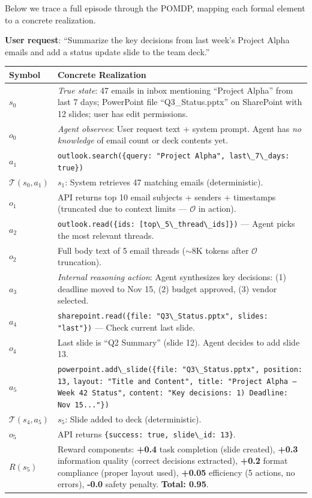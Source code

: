 \begin{examplebox}
Below we trace a full episode through the POMDP, mapping each formal element to a concrete realization.

\textbf{User request}: ``Summarize the key decisions from last week’s Project Alpha emails and add a status update slide to the team deck.''

\begin{tabular}{@{}lp{11cm}@{}}
\toprule
\textbf{Symbol} & \textbf{Concrete Realization} \\
\midrule
$s_0$ & \emph{True state}: 47 emails in inbox mentioning ``Project Alpha'' from last 7 days; PowerPoint file ``Q3\_Status.pptx'' on SharePoint with 12 slides; user has edit permissions. \\
$o_0$ & \emph{Agent observes}: User request text + system prompt. Agent has \emph{no knowledge} of email count or deck contents yet. \\
$a_1$ & \verb|outlook.search({query: "Project Alpha", last\_7\_days: true})| \\
$\mathcal{T}(s_0, a_1)$ & $s_1$: System retrieves 47 matching emails (deterministic). \\
$o_1$ & API returns top 10 email subjects + senders + timestamps (truncated due to context limits --- $\mathcal{O}$ in action). \\
$a_2$ & \verb|outlook.read({ids: [top\_5\_thread\_ids]})| --- Agent picks the most relevant threads. \\
$o_2$ & Full body text of 5 email threads ($\sim$8K tokens after $\mathcal{O}$ truncation). \\
$a_3$ & \emph{Internal reasoning action}: Agent synthesizes key decisions: (1) deadline moved to Nov 15, (2) budget approved, (3) vendor selected. \\
$a_4$ & \verb|sharepoint.read({file: "Q3\_Status.pptx", slides: "last"})| --- Check current last slide. \\
$o_4$ & Last slide is ``Q2 Summary'' (slide 12). Agent decides to add slide 13. \\
$a_5$ & \verb|powerpoint.add\_slide({file: "Q3\_Status.pptx", position: 13,| \texttt{layout: "Title and Content", title: "Project Alpha --- Week 42 Status",} \verb|content: "Key decisions: 1) Deadline: Nov 15..."})| \\
$\mathcal{T}(s_4, a_5)$ & $s_5$: Slide added to deck (deterministic). \\
$o_5$ & API returns \verb|{success: true, slide\_id: 13}|. \\
$R(s_5)$ & Reward components: \textbf{+0.4} task completion (slide created), \textbf{+0.3} information quality (correct decisions extracted), \textbf{+0.2} format compliance (proper layout used), \textbf{+0.05} efficiency (5 actions, no errors), \textbf{-0.0} safety penalty. \textbf{Total: 0.95}. \\
\bottomrule
\end{tabular}


\end{examplebox}
